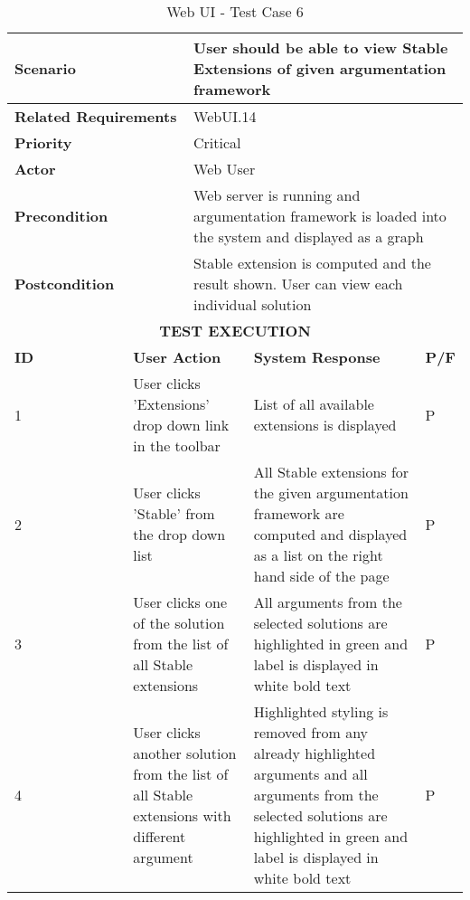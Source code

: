 \begin{longtable}[c]{p{}|p{}|p{}|p{}|p{}}
	\caption{Web UI - Test Case 6}
	\label{table:testcase6} \\
	\hline
	\multicolumn{2}{p{0.3\textwidth}}{\textbf{Scenario}} & \multicolumn{3}{p{0.7\textwidth}}{User should be able to view Stable Extensions of given argumentation framework} \\ 
	\hline
	\endfirsthead
	\endhead
	\multicolumn{2}{p{0.4\textwidth}}{\textbf{Related Requirements}} & \multicolumn{3}{p{0.6\textwidth}}{WebUI.14} \\ 
	\hline
	\multicolumn{2}{p{0.4\textwidth}}{\textbf{Priority}} & \multicolumn{3}{p{0.6\textwidth}}{Critical} \\ 
	\hline
	\multicolumn{2}{p{0.3\textwidth}}{\textbf{Actor}} & \multicolumn{3}{p{0.7\textwidth}}{Web User} \\ 
	\hline
	\multicolumn{2}{p{0.3\textwidth}}{\textbf{Precondition}} & \multicolumn{3}{p{0.7\textwidth}}{Web server is running and argumentation framework is loaded into the system and displayed as a graph} \\ 
	\hline
	\multicolumn{2}{p{0.3\textwidth}}{\textbf{Postcondition}} & \multicolumn{3}{p{0.7\textwidth}}{Stable extension is computed and the result shown. User can view each individual solution} \\ 
	\hline
	\multicolumn{5}{c}{\cellcolor{grey}\textbf{TEST EXECUTION}} \\ 
	\hline
	\textbf{ID} & \multicolumn{2}{|p{0.4\textwidth}|}{\textbf{User Action}} & \textbf{System Response} & \textbf{P/F} \\ 
	\hline
	1 & \multicolumn{2}{|p{0.4\textwidth}|}{User clicks 'Extensions' drop down link in the toolbar} & List of all available extensions is displayed & P \\ 
	\hline
	2 & \multicolumn{2}{|p{0.4\textwidth}|}{User clicks 'Stable' from the drop down list} & All Stable extensions for the given argumentation framework are computed and displayed as a list on the right hand side of the page & P \\ 
	\hline
	3 & \multicolumn{2}{|p{0.4\textwidth}|}{User clicks one of the solution from the list of all Stable extensions} & All arguments from the selected solutions are highlighted in green and label is displayed in white bold text & P \\ 
	\hline
	4 & \multicolumn{2}{|p{0.4\textwidth}|}{User clicks another solution from the list of all Stable extensions with different argument} & Highlighted styling is removed from any already highlighted arguments and all arguments from the selected solutions are highlighted in green and label is displayed in white bold text & P \\ 
	\hline
\end{longtable}

